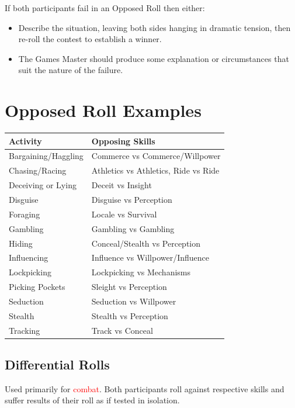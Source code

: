 \documentclass[10pt]{article}
\begin{document}
If both participants fail in an Opposed Roll then either:

\begin{itemize}
    \item Describe the situation, leaving both sides hanging in dramatic tension, then re-roll the contest to establish a winner.
    \item The Games Master should produce some explanation or circumstances that suit the nature of the failure.
\end{itemize}

\section{Opposed Roll Examples}

\begin{longtable}{|l|l|}
\hline
\textbf{Activity} & \textbf{Opposing Skills} \\
\hline
Bargaining/Haggling & Commerce vs Commerce/Willpower \\
Chasing/Racing & Athletics vs Athletics, Ride vs Ride \\
Deceiving or Lying & Deceit vs Insight \\
Disguise & Disguise vs Perception \\
Foraging & Locale vs Survival \\
Gambling & Gambling vs Gambling \\
Hiding & Conceal/Stealth vs Perception \\
Influencing & Influence vs Willpower/Influence \\
Lockpicking & Lockpicking vs Mechanisms \\
Picking Pockets & Sleight vs Perception \\
Seduction & Seduction vs Willpower \\
Stealth & Stealth vs Perception \\
Tracking & Track vs Conceal \\
\hline
\end{longtable}

\subsection{Differential Rolls}
\label{sec:differential}

Used primarily for \textcolor{red}{combat}. Both participants roll against respective skills and suffer results of their roll as if tested in isolation.
\end{document}
